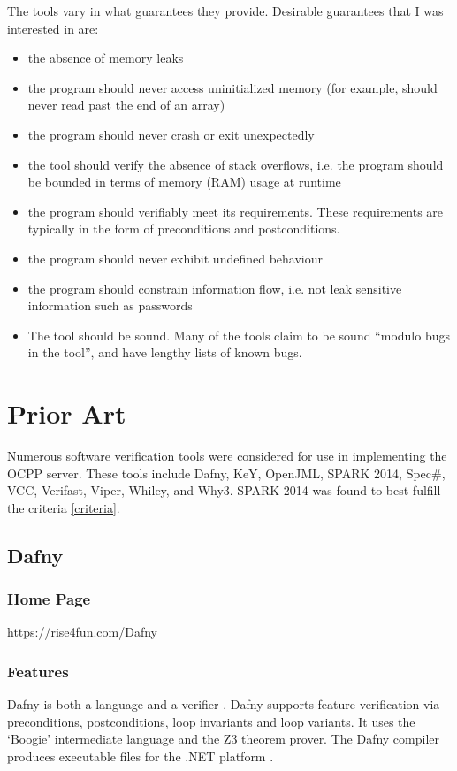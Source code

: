 \documentclass[12pt,openany,a4paper]{book}
\begin{document}
The tools vary in what guarantees they provide. Desirable guarantees that I was interested in are: 
\label{criteria}
\begin{itemize}
	\item the absence of memory leaks
	\item the program should never access uninitialized memory (for example, should never read past the end of an array)
	\item the program should never crash or exit unexpectedly
	\item the tool should verify the absence of stack overflows, i.e. the program should be bounded in terms of memory (RAM) usage at runtime
	\item the program should verifiably meet its requirements. These requirements are typically in the form of preconditions and postconditions.
	\item the program should never exhibit undefined behaviour
	\item the program should constrain information flow, i.e. not leak sensitive information such as passwords
	\item The tool should be sound. Many of the tools claim to be sound ``modulo bugs in the tool'', and have lengthy lists of known bugs. 
\end{itemize}

\chapter{Prior Art}

Numerous software verification tools were considered for use in implementing the OCPP server. These tools include Dafny, KeY, OpenJML, SPARK 2014, Spec\#, VCC, Verifast, Viper, Whiley, and Why3. SPARK 2014 was found to best fulfill the criteria \ref{criteria}.

\section{Dafny}
	\subsection{Home Page}%
		https://rise4fun.com/Dafny
	\subsection{Features}
		Dafny is both a language and a verifier \cite{LeinoK.R.M.2010DAap}. Dafny supports feature verification via preconditions, postconditions, loop invariants and loop variants. It uses the `Boogie' intermediate language and the Z3 theorem prover. The Dafny compiler produces executable files for the .NET platform \cite{dafny02}.
\end{document}
